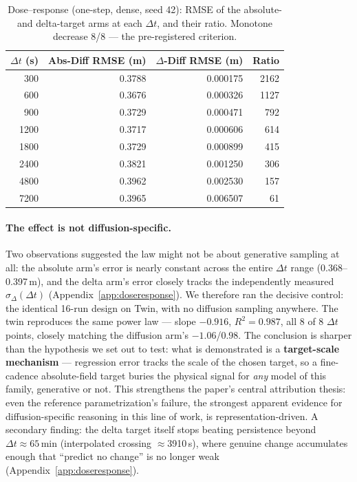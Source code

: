 \documentclass[11pt]{article}
\newcommand{\ours}{\mbox{$\Delta$-Diff}}
\newcommand{\absdiff}{\mbox{Abs-Diff}}
\newcommand{\twin}{\mbox{Twin}}
\begin{document}
\begin{table}[H]
\centering
\caption{Dose--response (one-step, dense, seed 42): RMSE of the
absolute- and delta-target arms at each $\Delta t$, and their ratio.
Monotone decrease 8/8 --- the pre-registered criterion.}
\label{tab:doseresponse}
\begin{tabular}{rrrr}
\toprule
$\Delta t$ (s) & \absdiff{} RMSE (m) & \ours{} RMSE (m) & Ratio \\
\midrule
300  & 0.3788 & 0.000175 & 2162 \\
600  & 0.3676 & 0.000326 & 1127 \\
900  & 0.3729 & 0.000471 & 792 \\
1200 & 0.3717 & 0.000606 & 614 \\
1800 & 0.3729 & 0.000899 & 415 \\
2400 & 0.3821 & 0.001250 & 306 \\
4800 & 0.3962 & 0.002530 & 157 \\
7200 & 0.3965 & 0.006507 & 61 \\
\bottomrule
\end{tabular}
\end{table}

\paragraph{The effect is not diffusion-specific.} Two observations
suggested the law might not be about generative sampling at all: the
absolute arm's error is nearly constant across the entire $\Delta t$
range (0.368--0.397\,m), and the delta arm's error closely tracks the
independently measured $\sigma_\Delta(\Delta t)$
(Appendix~\ref{app:doseresponse}). We therefore ran the decisive control:
the identical 16-run design on \twin{}, with no diffusion sampling
anywhere. The twin reproduces the same power law --- slope $-0.916$,
$R^2=0.987$, all 8 of 8 $\Delta t$ points, closely matching the diffusion
arm's $-1.06$/$0.98$. The
conclusion is sharper than the hypothesis we set out to test: what is
demonstrated is a \textbf{target-scale mechanism} --- regression error
tracks the scale of the chosen target, so a fine-cadence absolute-field
target buries the physical signal for \emph{any} model of this family,
generative or not. This strengthens the paper's central attribution
thesis: even the reference parametrization's failure, the strongest
apparent evidence for diffusion-specific reasoning in this line of work,
is representation-driven. A secondary finding: the delta target itself
stops beating persistence beyond $\Delta t\approx 65$\,min (interpolated
crossing $\approx$3910\,s), where genuine change accumulates enough that
``predict no change'' is no longer weak
(Appendix~\ref{app:doseresponse}).
\end{document}

